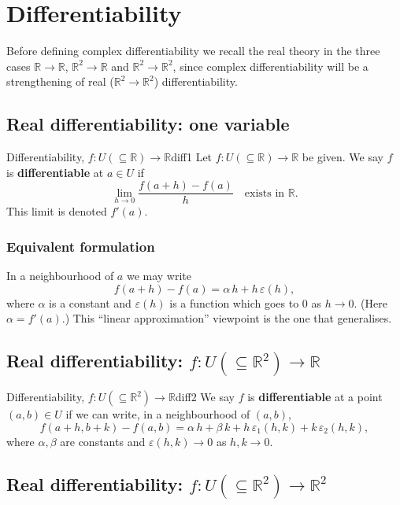 \documentclass[11pt,openany]{report}
\newcommand{\R}{\mathbb{R}}
\newcommand{\eps}{\varepsilon}
\begin{document}
\chapter{Differentiability}

Before defining complex differentiability we recall the real theory in the three cases
$\R\to\R$, $\R^2\to\R$ and $\R^2\to\R^2$, since complex differentiability will be a
strengthening of real ($\R^2\to\R^2$) differentiability.

\section{Real differentiability: one variable}

\begin{definition}{Differentiability, $f:U(\subseteq\R)\to\R$}{diff1}
Let $f:U(\subseteq\R)\to\R$ be given. We say $f$ is \textbf{differentiable} at $a\in U$ if
\[
  \lim_{h\to 0} \frac{f(a+h)-f(a)}{h} \quad\text{exists in } \R.
\]
This limit is denoted $f'(a)$.
\end{definition}

\subsection{Equivalent formulation}

In a neighbourhood of $a$ we may write
\[
  f(a+h) - f(a) = \alpha\,h + h\,\eps(h),
\]
where $\alpha$ is a constant and $\eps(h)$ is a function which goes to $0$ as $h\to0$.
(Here $\alpha=f'(a)$.) This ``linear approximation'' viewpoint is the one that generalises.

\section{Real differentiability: \texorpdfstring{$f:U(\subseteq\R^2)\to\R$}{f from R2 to R}}

\begin{definition}{Differentiability, $f:U(\subseteq\R^2)\to\R$}{diff2}
We say $f$ is \textbf{differentiable} at a point $(a,b)\in U$ if we can write, in a
neighbourhood of $(a,b)$,
\[
  f(a+h,b+k) - f(a,b) = \alpha\,h + \beta\,k + h\,\eps_1(h,k) + k\,\eps_2(h,k),
\]
where $\alpha,\beta$ are constants and $\eps(h,k)\to0$ as $h,k\to0$.
\end{definition}

\section{Real differentiability: \texorpdfstring{$f:U(\subseteq\R^2)\to\R^2$}{f from R2 to R2}}
\end{document}
